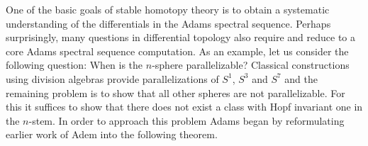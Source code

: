 





One of the basic goals of stable homotopy theory is to obtain a systematic understanding of the differentials in the Adams spectral sequence.
Perhaps surprisingly, many questions in differential topology also require and reduce to a core Adams spectral sequence computation. As an example, let us consider the following question: When is the $n$-sphere parallelizable?
Classical constructions using division algebras provide parallelizations of $S^1$, $S^3$ and $S^7$ and the remaining problem is to show that all other spheres are not parallelizable.
For this it suffices to show that there does not exist a class with Hopf invariant one in the $n$-stem. %
In order to approach this problem Adams began by reformulating earlier work of Adem into the following theorem.

